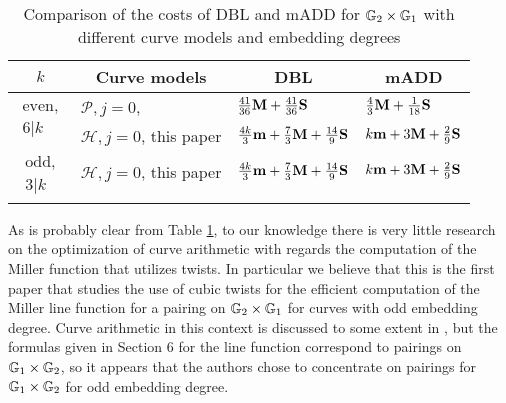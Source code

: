 \begin{table}[h]
\centering
\caption{Comparison of the costs of DBL and mADD for $\mathbb{G}_{2} \times \mathbb{G}_{1}$ with different curve models and embedding degrees}

\begin{tabular}{| l | l | l | l |}
\hline
\multicolumn{1}{|c|}{$k$}
&\multicolumn{1}{|c|}{Curve models}	&\multicolumn{1}{|c|}{DBL}	&\multicolumn{1}{|c|}{mADD}	
\\
\hline
\multicolumn{1}{|c|}{\multirow{2}{*}{
$\begin{array}{c} \text{even,} \\ 6|k \end{array}$}}
& $\mathcal{P},j=0$, \cite{2009/fastertate}
& $\frac{41}{36}\textbf{M} + \frac{41}{36}\textbf{S}$
& $\frac{4}{3}\textbf{M} + \frac{1}{18}\textbf{S}$ \\
& $\mathcal{H},j=0$, this paper
& $\frac{4k}{3}\textbf{m} + \frac{7}{3}\textbf{M} + \frac{14}{9}\textbf{S} $
& $k\textbf{m} + 3\textbf{M} + \frac{2}{9}\textbf{S}$ \\
\hline
\multicolumn{1}{|c|}{\multirow{2}{*}{
$\begin{array}{c} \text{odd,} \\ 3|k \end{array}$}}
& $\mathcal{H},j=0$, this paper
& $\frac{4k}{3}\textbf{m} + \frac{7}{3}\textbf{M} + \frac{14}{9}\textbf{S} $
& $k\textbf{m} + 3\textbf{M} + \frac{2}{9}\textbf{S}$ \\
&&& \\
\hline
\end{tabular}
\label{tbl-cmp2}


\end{table}

As is probably clear from Table \ref{tbl-cmp2}, to our knowledge there is very little research on the optimization of curve arithmetic with regards the computation of the Miller function 
that utilizes twists. 
In particular we believe that this is the first paper that studies the use of cubic twists for the efficient computation of the Miller line function for a pairing on $\mathbb{G}_{2} \times \mathbb{G}_{1}$
for curves with odd embedding degree.
Curve arithmetic in this context is discussed to some extent in \cite{2009/fastertate}, 
but the formulas given in Section 6 for the line function correspond to pairings on $\mathbb{G}_{1} \times \mathbb{G}_{2}$, so it appears that the authors chose to concentrate on pairings for $\mathbb{G}_{1} \times \mathbb{G}_{2}$ for odd embedding degree.

